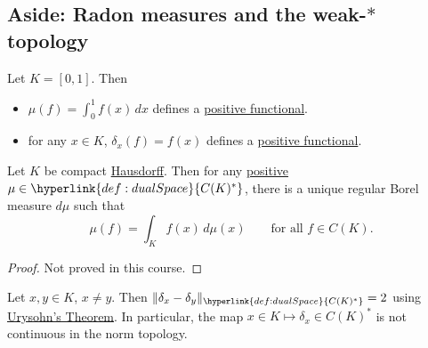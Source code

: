 \documentclass{article}
\begin{document}
\subsection{Aside: Radon measures and the weak-\texorpdfstring{$*$}{star} topology}
\begin{eg}
    Let $K = [0, 1]$. Then
    \begin{itemize}
        \item $\mu(f) = \int_0^1 f(x) \, dx$ defines a \hyperlink{def:positive}{positive functional}.
        \item for any $x \in K$, $\delta_x(f) = f(x)$ defines a \hyperlink{def:positive}{positive functional}.
    \end{itemize}
\end{eg}

\begin{thm}
    Let $K$ be compact \hyperlink{def:hausdorff}{Hausdorff}. Then for any \hyperlink{def:positive}{positive} $\mu \in \hyperlink{def:dualSpace}{C(K)^*}$, there is a unique regular Borel measure $d\mu$ such that
    \begin{equation*}
        \mu(f) = \int_K f(x) \, d\mu(x) \qquad \text{for all } f \in C(K).
    \end{equation*}
\end{thm}

\begin{proof}
    Not proved in this course.
\end{proof}

\begin{eg}
    Let $x, y \in K$, $x \neq y$. Then $\|\delta_x - \delta_y\|_{\hyperlink{def:dualSpace}{C(K)^*}} = 2$ using \hyperlink{prop:urysohn}{Urysohn's Theorem}.
    In particular, the map $x \in K \mapsto \delta_x \in C(K)^*$ is not continuous in the norm topology.
\end{eg}

\end{document}

